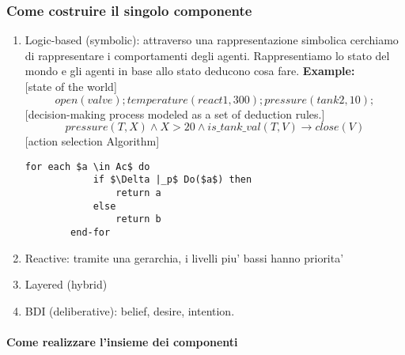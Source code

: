 \documentclass[11pt]{article}
\begin{document}
\subsubsection{Come costruire il singolo componente} %
\label{ssub:come_costruire_il_singolo_componente}
\begin{enumerate}
	\item Logic-based (symbolic): attraverso una rappresentazione simbolica cerchiamo di rappresentare i comportamenti degli agenti. Rappresentiamo lo stato del mondo e gli agenti in base allo stato deducono cosa fare. \textbf{Example:\\} 
	[state of the world]\\
	$$open(valve); temperature(react1, 300); pressure (tank2, 10);$$
	[decision-making process modeled as a set of deduction rules.]\\
	$$pressure(T,X) \land X>20 \land is\_tank\_val(T,V) \rightarrow close(V)$$
	[action selection Algorithm]
	\begin{lstlisting}[mathescape=true]
		for each $a \in Ac$ do
			if $\Delta |_p$ Do($a$) then
				return a 
			else 
				return b
		end-for
 	\end{lstlisting}
	\item Reactive: tramite una gerarchia, i livelli piu' bassi hanno priorita'
	\item Layered (hybrid)
	\item BDI (deliberative): belief, desire, intention.

\end{enumerate}
\paragraph{Come realizzare l'insieme dei componenti} %
\label{par:come_realizzare_l_insieme_dei_componenti}


\end{document}
